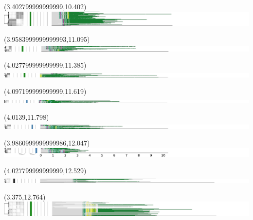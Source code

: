 \documentclass{article}
\begin{document}
\begin{textblock}{13}(3.402799999999999,10.402)\includegraphics{latex/figures/haplotypes-constrained/chr7-HG002.pdf}\end{textblock}
\begin{textblock}{13}(3.9583999999999993,11.095)\includegraphics{latex/figures/haplotypes-constrained/chr7-HG003.pdf}\end{textblock}
\begin{textblock}{13}(4.027799999999999,11.385)\includegraphics{latex/figures/haplotypes-constrained/chr7-HG004.pdf}\end{textblock}
\begin{textblock}{13}(4.097199999999999,11.619)\includegraphics{latex/figures/haplotypes-constrained/chr7-HG005.pdf}\end{textblock}
\begin{textblock}{13}(4.0139,11.798)\includegraphics{latex/figures/haplotypes-constrained/chr7-HG006.pdf}\end{textblock}
\begin{textblock}{13}(3.9860999999999986,12.047)\includegraphics{latex/figures/haplotypes-constrained/chr7-HG007.pdf}\end{textblock}
\begin{textblock}{13}(4.027799999999999,12.529)\includegraphics{latex/figures/haplotypes-constrained/chr8-HG001.pdf}\end{textblock}
\begin{textblock}{13}(3.375,12.764)\includegraphics{latex/figures/haplotypes-constrained/chr8-HG002.pdf}\end{textblock}
\end{document}
